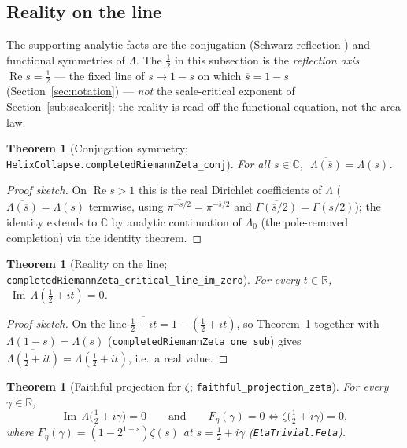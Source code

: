 \documentclass[11pt]{article}
\newtheorem{theorem}[definition]{Theorem}
\DeclareMathOperator{\Ree}{Re}
\DeclareMathOperator{\Imm}{Im}
\newcommand{\C}{\mathbb{C}}
\newcommand{\R}{\mathbb{R}}
\newcommand{\conj}[1]{\overline{#1}}
\newcommand{\code}[1]{\texttt{#1}}
\begin{document}
\subsection{Reality on the line}\label{sub:reality}

The supporting analytic facts are the conjugation (Schwarz reflection \cite{Ahlfors1979}) and
functional symmetries of $\Lambda$. The $\tfrac12$ in this subsection is the \emph{reflection axis}
$\Ree s=\tfrac12$ --- the fixed line of $s\mapsto 1-s$ on which $\conj s=1-s$
(Section~\ref{sec:notation}) --- \emph{not} the scale-critical exponent of
Section~\ref{sub:scalecrit}: the reality is read off the functional equation, not the area law.

\begin{theorem}[Conjugation symmetry; \code{HelixCollapse.completedRiemannZeta\_conj}]\label{thm:conj}
For all $s\in\C$, $\;\conj{\Lambda(\conj s)}=\Lambda(s)$.
\end{theorem}

\begin{proof}[Proof sketch]
On $\Ree s>1$ this is the real Dirichlet coefficients of $\Lambda$ ($\conj{\Lambda(\conj s)}=\Lambda(s)$
termwise, using $\conj{\pi^{-s/2}}=\pi^{-\conj s/2}$ and $\conj{\Gamma(\conj{s}/2)}=\Gamma(s/2)$); the
identity extends to $\C$ by analytic continuation of $\Lambda_0$ (the pole-removed completion) via the
identity theorem.
\end{proof}

\begin{theorem}[Reality on the line; \code{completedRiemannZeta\_critical\_line\_im\_zero}]\label{thm:real}
For every $t\in\R$, $\;\Imm\,\Lambda(\tfrac12+it)=0$.
\end{theorem}

\begin{proof}[Proof sketch]
On the line $\conj{\tfrac12+it}=1-(\tfrac12+it)$, so Theorem~\ref{thm:conj} together with
$\Lambda(1-s)=\Lambda(s)$ (\code{completedRiemannZeta\_one\_sub}) gives
$\conj{\Lambda(\tfrac12+it)}=\Lambda(\tfrac12+it)$, i.e.\ a real value.
\end{proof}

\begin{theorem}[Faithful projection for $\zeta$; \code{faithful\_projection\_zeta}]\label{thm:faithproj}
For every $\gamma\in\R$,
\[
  \Imm\,\Lambda\!\bigl(\tfrac12+i\gamma\bigr)=0
  \qquad\text{and}\qquad
  F_\eta(\gamma)=0 \iff \zeta\!\bigl(\tfrac12+i\gamma\bigr)=0,
\]
where $F_\eta(\gamma)=(1-2^{1-s})\zeta(s)$ at $s=\tfrac12+i\gamma$ (\code{EtaTrivial.Feta}).
\end{theorem}
\end{document}
